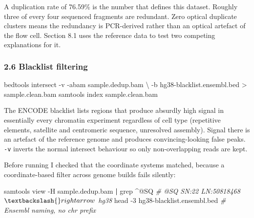 \documentclass[
  11pt,
  a4paper,
]{article}
\newenvironment{Shaded}{}{}
\newcommand{\AttributeTok}[1]{\textcolor[rgb]{0.49,0.56,0.16}{#1}}
\newcommand{\CommentTok}[1]{\textcolor[rgb]{0.38,0.63,0.69}{\textit{#1}}}
\newcommand{\DataTypeTok}[1]{\textcolor[rgb]{0.56,0.13,0.00}{#1}}
\newcommand{\ExtensionTok}[1]{#1}
\newcommand{\FunctionTok}[1]{\textcolor[rgb]{0.02,0.16,0.49}{#1}}
\newcommand{\KeywordTok}[1]{\textcolor[rgb]{0.00,0.44,0.13}{\textbf{#1}}}
\newcommand{\NormalTok}[1]{#1}
\newcommand{\OperatorTok}[1]{\textcolor[rgb]{0.40,0.40,0.40}{#1}}
\newcommand{\StringTok}[1]{\textcolor[rgb]{0.25,0.44,0.63}{#1}}
\begin{document}
A duplication rate of 76.59\% is the number that defines this dataset.
Roughly three of every four sequenced fragments are redundant. Zero
optical duplicate clusters means the redundancy is PCR-derived rather
than an optical artefact of the flow cell. Section 8.1 uses the
reference data to test two competing explanations for it.

\hypertarget{blacklist-filtering}{%
\subsubsection{2.6 Blacklist filtering}\label{blacklist-filtering}}

\begin{Shaded}
\begin{Highlighting}[]
\ExtensionTok{bedtools}\NormalTok{ intersect }\AttributeTok{{-}v} \AttributeTok{{-}abam}\NormalTok{ sample.dedup.bam }\DataTypeTok{\textbackslash{}}
  \AttributeTok{{-}b}\NormalTok{ hg38{-}blacklist.ensembl.bed }\OperatorTok{\textgreater{}}\NormalTok{ sample.clean.bam}
\ExtensionTok{samtools}\NormalTok{ index sample.clean.bam}
\end{Highlighting}
\end{Shaded}

The ENCODE blacklist lists regions that produce absurdly high signal in
essentially every chromatin experiment regardless of cell type
(repetitive elements, satellite and centromeric sequence, unresolved
assembly). Signal there is an artefact of the reference genome and
produces convincing-looking false peaks. \texttt{-v} inverts the normal
intersect behaviour so only non-overlapping reads are kept.

Before running I checked that the coordinate systems matched, because a
coordinate-based filter across genome builds fails silently:

\begin{Shaded}
\begin{Highlighting}[]
\ExtensionTok{samtools}\NormalTok{ view }\AttributeTok{{-}H}\NormalTok{ sample.dedup.bam }\KeywordTok{|} \FunctionTok{grep} \StringTok{\textquotesingle{}\textasciicircum{}@SQ\textquotesingle{}}   \CommentTok{\# @SQ SN:22 LN:50818468 $\textbackslash{}rightarrow$ hg38}
\FunctionTok{head} \AttributeTok{{-}3}\NormalTok{ hg38{-}blacklist.ensembl.bed                }\CommentTok{\# Ensembl naming, no \textquotesingle{}chr\textquotesingle{} prefix}
\end{Highlighting}
\end{Shaded}
\end{document}
